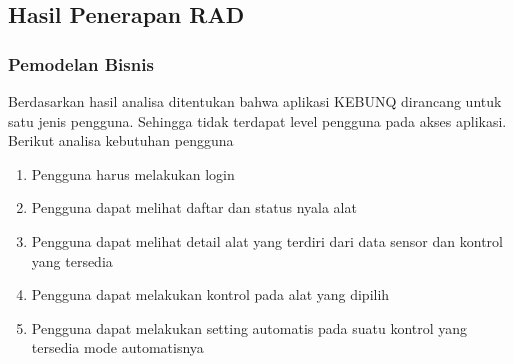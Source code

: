 \begin{flushleft}
\begin{justify}
        \subsection{Hasil Penerapan RAD}
        \subsubsection{Pemodelan Bisnis}
        Berdasarkan hasil analisa ditentukan bahwa aplikasi KEBUNQ dirancang untuk satu jenis pengguna. Sehingga tidak terdapat level pengguna pada akses aplikasi.
        Berikut analisa kebutuhan pengguna
        \begin{enumerate}
            \item Pengguna harus melakukan login
            \item Pengguna dapat melihat daftar dan status nyala alat
            \item Pengguna dapat melihat detail alat yang terdiri dari data sensor dan kontrol yang tersedia
            \item Pengguna dapat melakukan kontrol pada alat yang dipilih
            \item Pengguna dapat melakukan setting automatis pada suatu kontrol yang tersedia mode automatisnya\\
        \end{enumerate}
       

\end{justify}
\end{flushleft}

